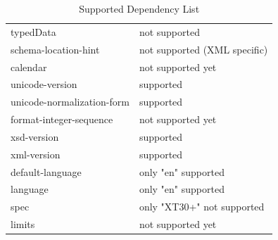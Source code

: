 \begin{table}[]
\begin{tabular}{ll}
		typedData                          & not supported                \\
		schema-location-hint               & not supported (XML specific) \\
		calendar                           & not supported yet            \\
		unicode-version                    & supported                    \\
		unicode-normalization-form         & supported                    \\
		format-integer-sequence            & not supported yet            \\
		xsd-version                        & supported                    \\
		xml-version                        & supported                    \\
		default-language                   & only "en" supported          \\
		language                           & only "en" supported          \\
		spec                               & only "XT30+" not supported   \\
		limits                             & not supported yet           
	\end{tabular}
	\caption{Supported Dependency List }
	\label{tab:Phase2_DependencyList}
\end{table}

